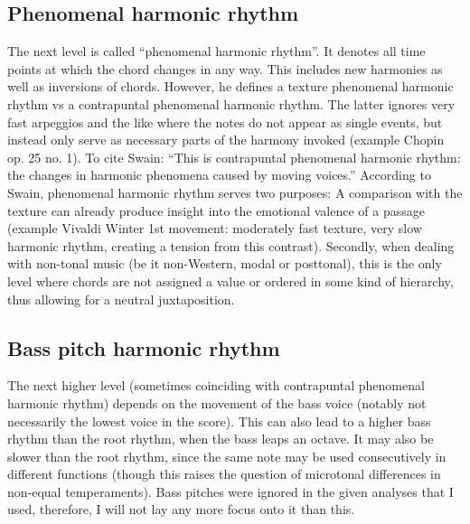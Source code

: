 \documentclass[a4paper,12pt]{report}
\begin{document}
\subsection{Phenomenal harmonic rhythm}
The next level is called ``phenomenal harmonic rhythm''. It denotes all time points at which the chord
changes in any way. This includes new harmonies as well as inversions of chords. However, he defines a
texture phenomenal harmonic rhythm vs a contrapuntal phenomenal harmonic rhythm. The latter ignores
very fast arpeggios and the like where the notes do not appear as single events, but instead only serve as
necessary parts of the harmony invoked (example Chopin op. 25 no. 1). To cite Swain: ``This is
contrapuntal phenomenal harmonic rhythm: the changes in harmonic phenomena caused by moving voices.''
According to Swain, phenomenal harmonic rhythm serves two purposes: A comparison with the texture
can already produce insight into the emotional valence of a passage (example Vivaldi Winter 1st movement:
moderately fast texture, very slow harmonic rhythm, creating a tension from this contrast). Secondly, when
dealing with non-tonal music (be it non-Western, modal or posttonal), this is the only level where chords
are not assigned a value or ordered in some kind of hierarchy, thus allowing for a neutral juxtaposition.

\subsection{Bass pitch harmonic rhythm}
The next higher level (sometimes coinciding with contrapuntal phenomenal harmonic rhythm) depends on
the movement of the bass voice (notably not necessarily the lowest voice in the score). This can also lead
to a higher bass rhythm than the root rhythm, when the bass leaps an octave. It may also be slower than
the root rhythm, since the same note may be used consecutively in different functions (though this raises
the question of microtonal differences in non-equal temperaments). Bass pitches were ignored in the given
analyses that I used, therefore, I will not lay any more focus onto it than this.
\end{document}
